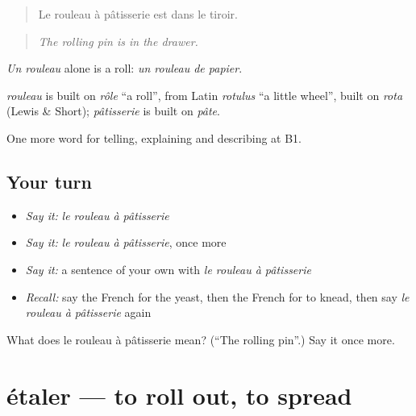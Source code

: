 \begin{quote}
Le rouleau à pâtisserie est dans le tiroir.
\end{quote}

\begin{quote}
\emph{The rolling pin is in the drawer.}
\end{quote}

\emph{Un rouleau} alone is a roll: \emph{un rouleau de papier}.

\begin{cousinweb}
\emph{rouleau} is built on \emph{rôle} \textquotedblleft{}a roll\textquotedblright{}, from Latin \emph{rotulus} \textquotedblleft{}a little wheel\textquotedblright{}, built on \emph{rota} (Lewis \& Short); \emph{pâtisserie} is built on \emph{pâte}.
\end{cousinweb}

\begin{grammarlens}[title={What you've built}]
One more word for telling, explaining and describing at B1.
\end{grammarlens}

\subsection*{Your turn}
\begin{itemize}
\raggedright
  \item \emph{Say it:} \emph{le rouleau à pâtisserie}
  \item \emph{Say it:} \emph{le rouleau à pâtisserie}, once more
  \item \emph{Say it:} a sentence of your own with \emph{le rouleau à pâtisserie}
  \item \emph{Recall:} say the French for the yeast, then the French for to knead, then say \emph{le rouleau à pâtisserie} again
\end{itemize}

\begin{tcolorbox}[breakable,colback=teal!4,colframe=teal!35!black,title={Before you move on}]
What does le rouleau à pâtisserie mean? (\textquotedblleft{}The rolling pin\textquotedblright{}.) Say it once more.
\end{tcolorbox}
\section[étaler]{étaler — to roll out, to spread}

\label{lesson:FR-C333-etaler}



